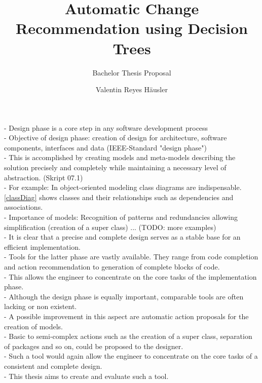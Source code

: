 \documentclass[10pt,a4paper,oneside]{scrartcl}
\title{Automatic Change Recommendation using Decision Trees}
\subtitle{Bachelor Thesis Proposal}
\author{Valentin Reyes Häusler}
\begin{document}
	
	\maketitle
	
	\section{}
	\label{sec:motivation}
	
	- Design phase is a core step in any software development process
	\\
	- Objective of design phase: creation of design for architecture, software components, interfaces and data (IEEE-Standard "design phase")
	\\
	- This is accomplished by creating models and meta-models describing the solution precisely and completely while maintaining a necessary level of abstraction. (Skript 07.1)
	\\
	- For example: In object-oriented modeling class diagrams are indispensable. \ref{classDiag} shows classes and their relationships such as dependencies and associations. 
	\\
	- Importance of models: 
	Recognition of patterns and redundancies allowing simplification (creation of a super class) 
	... (TODO: more examples)
	\\
	- It is clear that a precise and complete design serves as a stable base for an efficient implementation.
	\\
	- Tools for the latter phase are vastly available. They range from code completion and action recommendation to generation of complete blocks of code.
	\\
	- This allows the engineer to concentrate on the core tasks of the implementation phase.
	\\
	- Although the design phase is equally important, comparable tools are often lacking or non existent.
	\\
	- A possible improvement in this aspect are automatic action proposals for the creation of models.
	\\
	- Basic to semi-complex actions such as the creation of a super class, separation of packages and so on, could be proposed to the designer.
	\\
	- Such a tool would again allow the engineer to concentrate on the core tasks of a consistent and complete design.
	\\
	- This thesis aims to create and evaluate such a tool.
\end{document}
